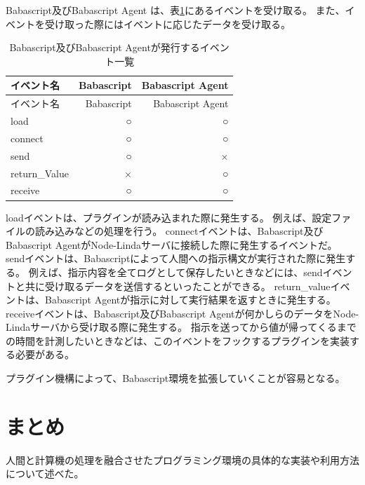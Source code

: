 Babascript及びBabascript Agent
は、表\ref{table:plugin-events}にあるイベントを受け取る。
また、イベントを受け取った際にはイベントに応じたデータを受け取る。

\begin{longtable}[c]{@{}lrr@{}}
\caption{Babascript及びBabascript Agentが発行するイベント一覧
\label{table:plugin-events}}\tabularnewline
\toprule
イベント名 & Babascript & Babascript Agent\tabularnewline
\midrule
\endfirsthead
\toprule
イベント名 & Babascript & Babascript Agent\tabularnewline
\midrule
\endhead
load & ○ & ○\tabularnewline
connect & ○ & ○\tabularnewline
send & ○ & ×\tabularnewline
return\_Value & × & ○\tabularnewline
receive & ○ & ○\tabularnewline
\bottomrule
\end{longtable}

loadイベントは、プラグインが読み込まれた際に発生する。
例えば、設定ファイルの読み込みなどの処理を行う。
connectイベントは、Babascript及びBabascript
AgentがNode-Lindaサーバに接続した際に発生するイベントだ。
sendイベントは、Babascriptによって人間への指示構文が実行された際に発生する。
例えば、指示内容を全てログとして保存したいときなどには、sendイベントと共に受け取るデータを送信するといったことができる。
return\_valueイベントは、Babascript
Agentが指示に対して実行結果を返すときに発生する。
receiveイベントは、Babascript及びBabascript
Agentが何かしらのデータをNode-Lindaサーバから受け取る際に発生する。
指示を送ってから値が帰ってくるまでの時間を計測したいときなどは、このイベントをフックするプラグインを実装する必要がある。

プラグイン機構によって、Babascript環境を拡張していくことが容易となる。

\section{まとめ}\label{ux307eux3068ux3081}

人間と計算機の処理を融合させたプログラミング環境の具体的な実装や利用方法について述べた。
